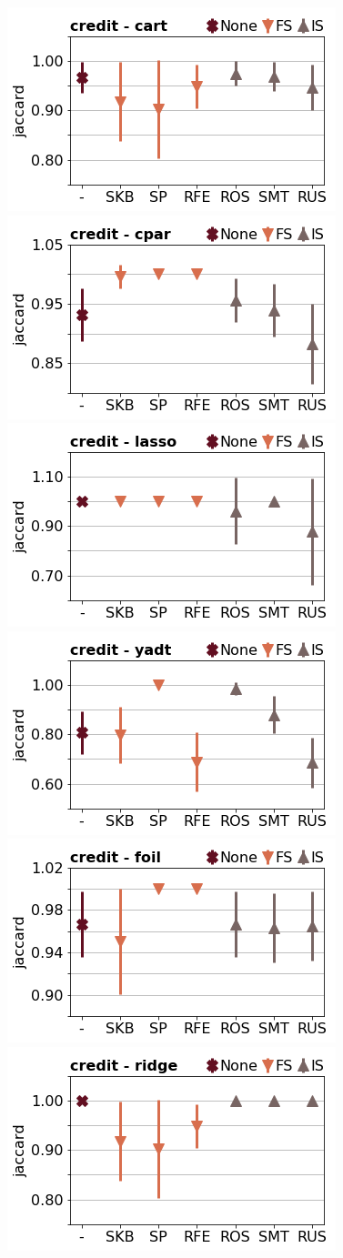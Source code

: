 \documentclass[runningheads,a4paper]{llncs}
\begin{document}
\begin{figure}[!h]
\includegraphics[width=0.32\linewidth]{fig/preps_credit_DT_sklearn_jaccard.png}
\includegraphics[width=0.32\linewidth]{fig/preps_credit_RB_cpar_jaccard.png}
\includegraphics[width=0.32\linewidth]{fig/preps_credit_LM_lasso_jaccard.png}
\includegraphics[width=0.32\linewidth]{fig/preps_credit_DT_yadt_jaccard.png}
\includegraphics[width=0.32\linewidth]{fig/preps_credit_RB_foil_jaccard.png}
\includegraphics[width=0.32\linewidth]{fig/preps_credit_LM_ridge_jaccard.png}
\end{figure}
\end{document}
